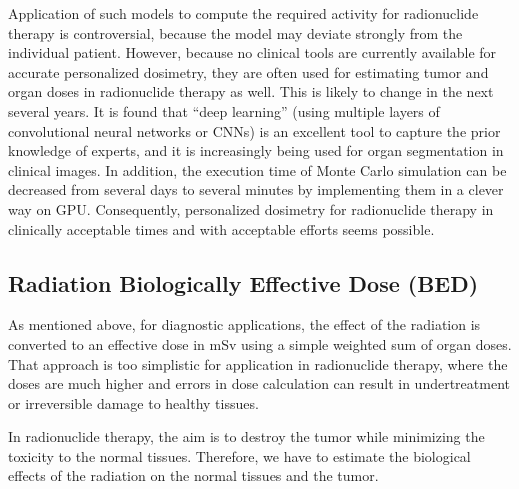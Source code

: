\documentclass[11pt,oneside]{article}
\begin{document}
Application of such models to compute the required activity for
radionuclide therapy is controversial, because the model may deviate
strongly from the individual patient. However, because no clinical
tools are currently available for accurate personalized dosimetry,
they are often used for estimating tumor and organ doses in
radionuclide therapy as well. This is likely to change in the next
several years. It is found that ``deep learning'' (using multiple
layers of convolutional neural networks or CNNs) is an excellent tool
to capture the prior knowledge of experts, and it is increasingly
being used for organ segmentation in clinical images. In addition, the
execution time of Monte Carlo simulation can be decreased from several
days to several minutes by implementing them in a clever way on
GPU. Consequently, personalized dosimetry for radionuclide therapy in
clinically acceptable times and with acceptable efforts seems
possible.

\subsection{Radiation Biologically Effective Dose (BED)}
As mentioned above, for diagnostic applications, the effect of the
radiation is converted to an effective dose in mSv using a simple
weighted sum of organ doses. That approach is too simplistic for
application in radionuclide therapy, where the doses are much higher
and errors in dose calculation can result in undertreatment or
irreversible damage to healthy tissues.

In radionuclide therapy, the aim is to destroy the tumor while
minimizing the toxicity to the normal tissues. Therefore, we have to
estimate the biological effects of the radiation on the normal tissues
and the tumor.
\end{document}
